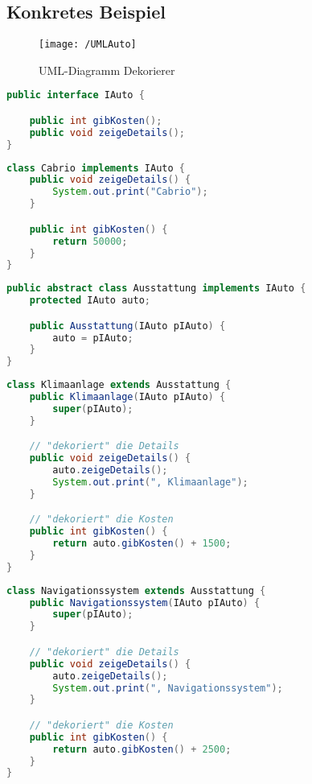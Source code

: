 \documentclass[12pt,a4paper,titlepage]{article}
\theoremstyle{definition}
\begin{document}
\newpage

\subsection{Konkretes Beispiel}

\begin{figure}[htbp]
\begin{center}
\texttt{[image: /UMLAuto]}

\caption{UML-Diagramm Dekorierer}
\label{default}
\end{center}
\end{figure}

\begin{lstlisting}[language=Java, caption=IAuto.java]
public interface IAuto {

	public int gibKosten();
	public void zeigeDetails();
}
\end{lstlisting}

\newpage

\begin{lstlisting}[language=Java, caption=Cabrio.java]
class Cabrio implements IAuto {
	public void zeigeDetails() {
		System.out.print("Cabrio");
	}

	public int gibKosten() {
		return 50000;
	}
}
\end{lstlisting}

\begin{lstlisting}[language=Java, caption=Ausstattung.java]
public abstract class Ausstattung implements IAuto {
	protected IAuto auto;

	public Ausstattung(IAuto pIAuto) {
		auto = pIAuto;
	}
}
\end{lstlisting}

\begin{lstlisting}[language=Java, caption=Klimaanlage.java]
class Klimaanlage extends Ausstattung {
	public Klimaanlage(IAuto pIAuto) {
		super(pIAuto);
	}

	// "dekoriert" die Details
	public void zeigeDetails() {
		auto.zeigeDetails();
		System.out.print(", Klimaanlage");
	}

	// "dekoriert" die Kosten
	public int gibKosten() {
		return auto.gibKosten() + 1500;
	}
}
\end{lstlisting}

\newpage

\begin{lstlisting}[language=Java, caption=Navigationssystem.java]
class Navigationssystem extends Ausstattung {
	public Navigationssystem(IAuto pIAuto) {
		super(pIAuto);
	}

	// "dekoriert" die Details
	public void zeigeDetails() {
		auto.zeigeDetails();
		System.out.print(", Navigationssystem");
	}

	// "dekoriert" die Kosten
	public int gibKosten() {
		return auto.gibKosten() + 2500;
	}
}
\end{lstlisting}
\end{document}
